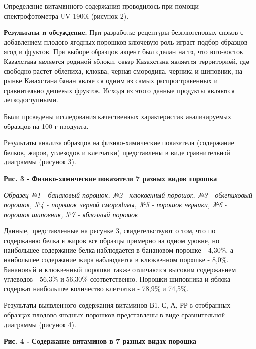 \begin{multicols}{2}
Определение витаминного содержания проводилось при помощи
спектрофотометра UV-1900i (рисунок 2).

{\bfseries Результаты и обсуждение.} При разработке рецептуры безглютеновых
снэков с добавлением плодово-ягодных порошков ключевую роль играет
подбор образцов ягод и фруктов. При выборе образцов акцент был сделан на
то, что юго-восток Казахстана является родиной яблоки, север Казахстана
является территорией, где свободно растет облепиха, клюква, черная
смородина, черника и шиповник, на рынке Казахстана банан является одним
из самых распространенных и сравнительно дешевых фруктов. Исходя из
этого данные продукты являются легкодоступными.

Были проведены исследования качественных характеристик анализируемых
образцов на 100 г продукта.

Результаты анализа образцов на физико-химические показатели (содержание
белков, жиров, углеводов и клетчатки) представлены в виде сравнительной
диаграммы (рисунок 3).
\end{multicols}

{\bfseries Рис. 3 - Физико-химические показатели 7 разных видов порошка}

\emph{Образец №1 - банановый порошок, №2 - клюквенный порошок, №3 -
облепиховый порошок, №4 - порошок черной смородины, №5 - порошок
черники, №6 - порошок шиповник, №7 - яблочный порошок}

Данные, представленные на рисунке 3, свидетельствуют о том, что по
содержанию белка и жиров все образцы примерно на одном уровне, но
наибольшее содержание белка наблюдается в банановом порошке - 4,30\%, а
наибольшее содержание жира наблюдается в клюквенном порошке - 8,0\%.
Банановый и клюквенный порошки также отличаются высоким содержанием
углеводов - 56,3\% и 56,30\% соответственно. Порошки шиповника и яблока
содержат наибольшее количество клетчатки - 78,9\% и 74,5\%.

Результаты выявленного содержания витаминов В1, С, А, РР в отобранных
образцах плодово-ягодных порошков представлены в виде сравнительной
диаграммы (рисунок 4).

{\bfseries Рис. 4 - Содержание витаминов в 7 разных видах порошка}

